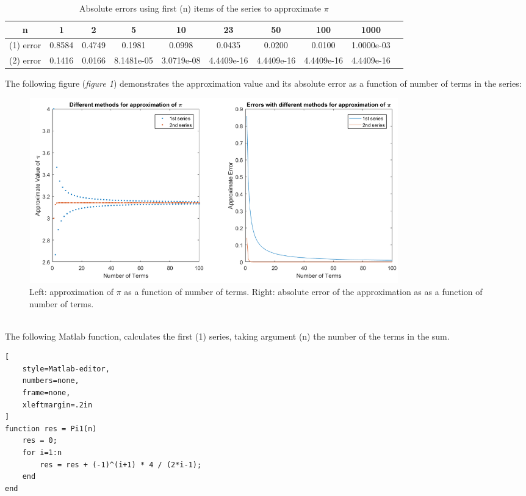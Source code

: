 \documentclass[a4paper,11pt]{article}
\begin{document}
\begin{center}
\begin{table}[h!]
\small
\begin{tabular}{ |c|c|c|c|c|c|c|c|c|c| }
 \hline
 n & 1 & 2 & 5 & 10 & 23 & 50 & 100 & 1000 \\
 \hline
 (1) error & 0.8584 & 0.4749 & 0.1981 & 0.0998 & 0.0435 & 0.0200 & 0.0100 & 1.0000e-03 \\
 \hline
 (2) error & 0.1416 & 0.0166 & 8.1481e-05 & 3.0719e-08 & 4.4409e-16 & 4.4409e-16 & 4.4409e-16 & 4.4409e-16 \\
 \hline
\end{tabular}
\caption{Absolute errors using first (n) items of the series to approximate $\pi$}
\end{table}
\end{center}

\newpage
\noindent
The following figure (\emph{figure 1}) demonstrates the approximation value and its absolute error as a function of number of terms in the series: 
\begin{figure}[!htb]
  \centering
  \includegraphics[width=16cm, height=8cm]{plots.png}
  \caption{\small Left: approximation of $\pi$ as a function of number of terms. Right: absolute error of the approximation as as a function of number of terms.}
\end{figure}

\noindent
\\The following Matlab function, calculates the first (1) series, taking argument (n) the number of the terms in the sum.
\begin{lstlisting}[
    style=Matlab-editor,
    numbers=none,
    frame=none,
    xleftmargin=.2in
]
function res = Pi1(n)
    res = 0;
    for i=1:n
        res = res + (-1)^(i+1) * 4 / (2*i-1);
    end
end
\end{lstlisting}
\end{document}
